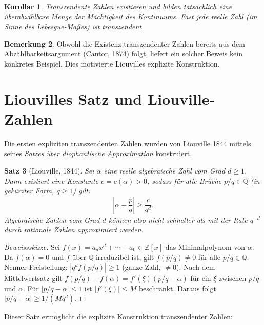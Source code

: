 \documentclass[12pt,a4paper]{amsart}
\newtheorem{theorem}{Satz}[section]
\newtheorem{korollar}[theorem]{Korollar}
\theoremstyle{definition}
\newtheorem{bemerkung}[theorem]{Bemerkung}
\begin{document}
\begin{korollar}
Transzendente Zahlen existieren und bilden tatsächlich eine überabzählbare
Menge der Mächtigkeit des Kontinuums. Fast jede reelle Zahl (im Sinne des
Lebesgue-Maßes) ist transzendent.
\end{korollar}

\begin{bemerkung}
Obwohl die Existenz transzendenter Zahlen bereits aus dem Abzählbarkeitsargument
(Cantor, 1874) folgt, liefert ein solcher Beweis kein konkretes Beispiel.
Dies motivierte Liouvilles explizite Konstruktion.
\end{bemerkung}


\section{Liouvilles Satz und Liouville-Zahlen}
\label{sec:liouville}

Die ersten expliziten transzendenten Zahlen wurden von Liouville 1844 mittels
seines \emph{Satzes über diophantische Approximation} konstruiert.

\begin{theorem}[Liouville, 1844]
\label{satz:liouville}
Sei $\alpha$ eine reelle algebraische Zahl vom Grad $d \geq 1$. Dann existiert
eine Konstante $c = c(\alpha) > 0$, sodass für alle Brüche $p/q \in \mathbb{Q}$
(in gekürzter Form, $q \geq 1$) gilt:
\[
  \left|\alpha - \frac{p}{q}\right| \geq \frac{c}{q^d}.
\]
Algebraische Zahlen vom Grad $d$ können also nicht schneller als mit der Rate
$q^{-d}$ durch rationale Zahlen approximiert werden.
\end{theorem}

\begin{proof}[Beweissskizze]
Sei $f(x) = a_d x^d + \cdots + a_0 \in \mathbb{Z}[x]$ das Minimalpolynom von
$\alpha$. Da $f(\alpha) = 0$ und $f$ über $\mathbb{Q}$ irreduzibel ist, gilt
$f(p/q) \neq 0$ für alle $p/q \in \mathbb{Q}$.
Nenner-Freistellung: $|q^d f(p/q)| \geq 1$ (ganze Zahl, $\neq 0$).
Nach dem Mittelwertsatz gilt $f(p/q) - f(\alpha) = f'(\xi)(p/q - \alpha)$
für ein $\xi$ zwischen $p/q$ und $\alpha$. Für $|p/q - \alpha| \leq 1$
ist $|f'(\xi)| \leq M$ beschränkt. Daraus folgt
$|p/q - \alpha| \geq 1/(M q^d)$.
\end{proof}

Dieser Satz ermöglicht die explizite Konstruktion transzendenter Zahlen:
\end{document}
